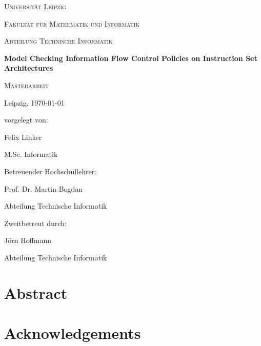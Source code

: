 \documentclass{book}
\theoremstyle{remark}
\newenvironment{abstract}{%
    \begingroup
    \chapter*{\centering Abstract}
}{%
    \endgroup
}
\newenvironment{acknowledgements}{%
    \begingroup
    \chapter*{\centering Acknowledgements}
}{%
    \endgroup
}
\begin{document}
\begin{titlepage}
    \centering
    \par
    \vspace{1cm}
    {\scshape\LARGE Universität Leipzig} \par
    \vspace{0.3cm}
    {\scshape\Large Fakultät für Mathematik und Informatik} \par
    {\scshape\Large Abteilung Technische Informatik} \par
    \vspace{2.3cm}
    {\huge\bfseries Model Checking Information Flow Control Policies on Instruction Set Architectures} \par
    \vspace{1.5cm}
    {\scshape\Large Masterarbeit} \par
    \vspace{1.8cm}
    \begin{multicols}{2}
        Leipzig, \today \par
        \columnbreak
        vorgelegt von: \par
        Felix Linker \par
        M.Sc. Informatik
    \end{multicols}
    \vfill
    \begin{multicols}{2}
        Betreuender Hochschullehrer: \par
        Prof. Dr. Martin Bogdan \par
        Abteilung Technische Informatik \par
        \columnbreak
        Zweitbetreut durch: \par
        Jörn Hoffmann \par
        Abteilung Technische Informatik
    \end{multicols}
\end{titlepage}

\pagestyle{empty}
\begin{abstract}
    
\end{abstract}

\begin{acknowledgements}
    
\end{acknowledgements}

\tableofcontents

\printnoidxglossary[type=acronym]

\pagestyle{plain}
\setcounter{page}{1}
\end{document}
